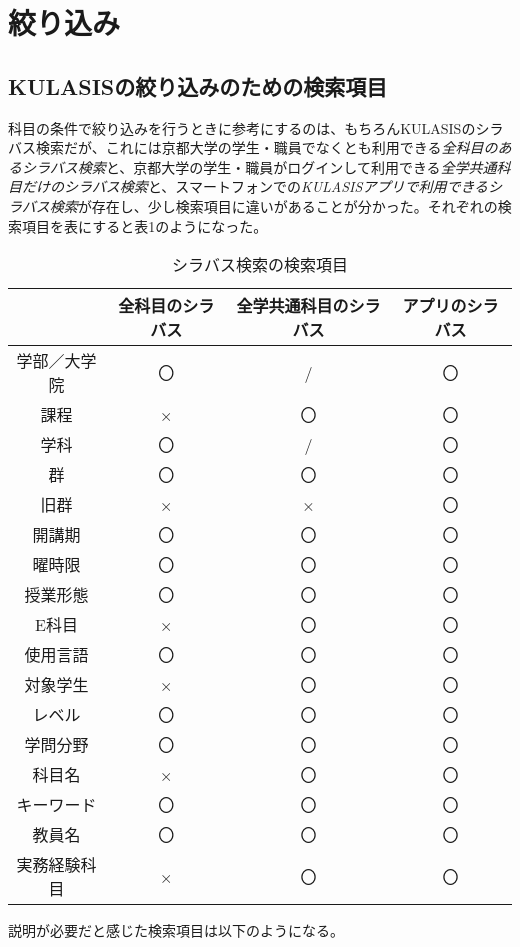 \section{絞り込み}
\subsection{KULASISの絞り込みのための検索項目}
科目の条件で絞り込みを行うときに参考にするのは、もちろんKULASISのシラバス検索だが、これには京都大学の学生・職員でなくとも利用できる\emph{全科目のあるシラバス検索}と、京都大学の学生・職員がログインして利用できる\emph{全学共通科目だけのシラバス検索}と、スマートフォンでの\emph{KULASISアプリで利用できるシラバス検索}が存在し、少し検索項目に違いがあることが分かった。それぞれの検索項目を表にすると表1のようになった。\\

\begin{table}[h]
\centering
\caption{シラバス検索の検索項目}
\begin{tabular}{cccc}\hline
 & 全科目のシラバス & 全学共通科目のシラバス & アプリのシラバス\\ \hline
学部／大学院& 〇 & / & 〇\\
課程& × & 〇 & 〇\\
学科& 〇 & / & 〇\\
群& 〇 & 〇 & 〇\\
旧群& ×& × & 〇\\
開講期& 〇 & 〇 & 〇\\
曜時限& 〇 & 〇 & 〇\\
授業形態& 〇 & 〇 & 〇\\
E科目& × & 〇 & 〇\\
使用言語& 〇 & 〇 & 〇\\
対象学生& × & 〇 & 〇\\
レベル& 〇 & 〇 & 〇\\
学問分野& 〇 & 〇 & 〇\\
科目名& × & 〇 & 〇\\
キーワード& 〇 & 〇 & 〇\\
教員名& 〇 & 〇 & 〇\\
実務経験科目& × & 〇 & 〇\\ \hline
\end{tabular}
\end{table}

説明が必要だと感じた検索項目は以下のようになる。\\

